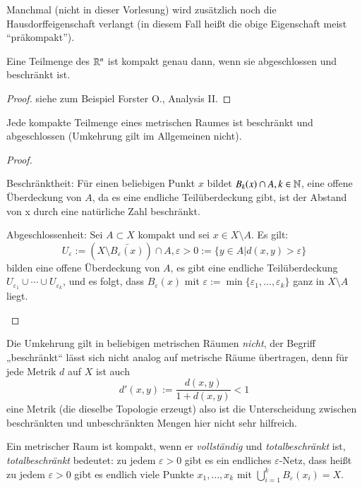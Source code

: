 \documentclass[a4paper,10pt]{scrartcl}
\newcommand{\eps}{\varepsilon}
\begin{document}
\begin{note}\label{thm:6.3}
 Manchmal (nicht in dieser Vorlesung) wird zusätzlich noch die Hausdorffeigenschaft verlangt (in diesem Fall heißt die obige Eigenschaft meist "`präkompakt"').
\end{note}
\begin{st}\label{thm:1.6.4}
 Eine Teilmenge des $\mathbb{R}^n$ ist kompakt genau dann, wenn sie abgeschlossen und beschränkt ist.
\end{st}
\begin{proof}
 siehe zum Beispiel Forster O., Analysis II.
\end{proof}
\begin{st}\label{thm:1.6.5}
 Jede kompakte Teilmenge eines metrischen Raumes ist beschränkt und abgeschlossen (Umkehrung gilt im Allgemeinen nicht).
\end{st}
\begin{proof}
 \begin{seg}{Beschränktheit:}
  Für einen beliebigen Punkt $x$ bildet $B_k(x)\cap A, k \in \mathbb{N}$, eine offene Überdeckung von $A$, da es eine endliche Teilüberdeckung gibt, ist der Abstand von x durch eine natürliche Zahl beschränkt.
 \end{seg}
\begin{seg}{Abgeschlossenheit:}
 Sei $A\subset X$ kompakt und sei $x\in X\setminus A$. Es gilt:
\[
 U_\eps:=(X\setminus\bar{B_\eps(x)})\cap A, \eps>0 := \{ y\in A|d(x,y) > \eps\}
\]
bilden eine offene Überdeckung von $A$, es gibt eine endliche Teilüberdeckung $U_{\eps_1}\cup\dotsb  \cup U_{\eps_k}$, und es folgt, dass $B_\eps(x)$ mit $\eps:=\min\{\eps_1,\dotsc  ,\eps_k\}$ ganz in $X\setminus A$ liegt.
\begin{figure}[H]
\centering
 \fixme[fig26]
\caption{}
\end{figure}
\end{seg}
\end{proof}
Die Umkehrung gilt in beliebigen metrischen Räumen \emph{nicht}, der Begriff „beschränkt“ lässt sich nicht analog auf metrische Räume übertragen, denn für jede Metrik $d$ auf $X$ ist auch
\[
 d'(x,y):=\frac{d(x,y)}{1+d(x,y)}<1
\]
eine Metrik (die dieselbe Topologie erzeugt) also ist die Unterscheidung zwischen beschränkten und unbeschränkten Mengen hier nicht sehr hilfreich.
\begin{note*}
 Ein metrischer Raum ist kompakt, wenn er \emph{vollständig} und \emph{totalbeschränkt} ist, \emph{totalbeschränkt} bedeutet: zu jedem $\eps>0$ gibt es ein endliches $\eps$-Netz, dass heißt zu jedem $\eps>0$ gibt es endlich viele Punkte $x_1,\dotsc  ,x_k$ mit $\bigcup_{i=1}^kB_\eps(x_i)=X$.
\end{note*}
\end{document}

